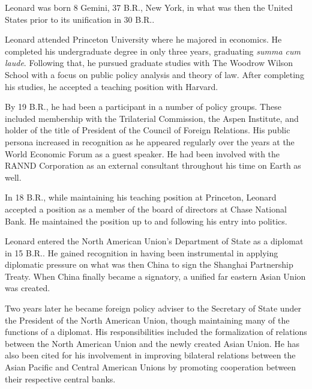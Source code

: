 
Leonard was born 8 Gemini, 37 B.R., New York, in what was then the United States prior to its unification in 30 B.R..

Leonard attended Princeton University where he majored in economics. He completed his undergraduate degree in only three years, graduating {\it summa cum laude}. Following that, he pursued graduate studies with The Woodrow Wilson School with a focus on public policy analysis and theory of law. After completing his studies, he accepted a teaching position with Harvard.

By 19 B.R., he had been a participant in a number of policy groups. These included membership with the Trilaterial Commission, the Aspen Institute, and holder of the title of President of the Council of Foreign Relations. His public persona increased in recognition as he appeared regularly over the years at the World Economic Forum as a guest speaker. He had been involved with the RANND Corporation as an external consultant throughout his time on Earth as well.

In 18 B.R., while maintaining his teaching position at Princeton, Leonard accepted a position as a member of the board of directors at Chase National Bank. He maintained the position up to and following his entry into politics.

Leonard entered the North American Union's Department of State as a diplomat in 15 B.R.. He gained recognition in having been instrumental in applying diplomatic pressure on what was then China to sign the Shanghai Partnership Treaty. When China finally became a signatory, a unified far eastern Asian Union was created. 

Two years later he became foreign policy adviser to the Secretary of State under the President of the North American Union, though maintaining many of the functions of a diplomat. His responsibilities included the formalization of relations between the North American Union and the newly created Asian Union. He has also been cited for his involvement in improving bilateral relations between the Asian Pacific and Central American Unions by promoting cooperation between their respective central banks. 

